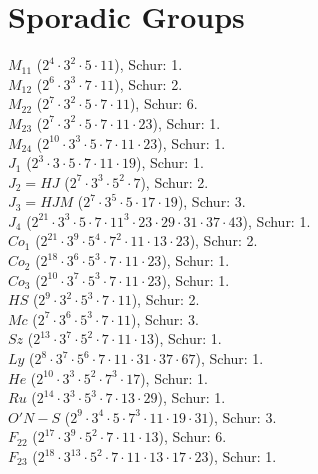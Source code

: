 \section {Sporadic Groups}
$M_{11}$ ($2^4 \cdot 3^2 \cdot 5 \cdot 11$), Schur: 1.
\\
$M_{12}$ ($2^6 \cdot 3^3 \cdot 7 \cdot 11$), Schur: 2.
\\
$M_{22}$ ($2^{7} \cdot 3^2 \cdot 5 \cdot 7 \cdot 11$), Schur: 6.
\\
$M_{23}$ ($2^{7} \cdot 3^2 \cdot 5 \cdot 7 \cdot 11 \cdot 23$), Schur: 1.
\\
$M_{24}$ ($2^{10} \cdot 3^3 \cdot 5 \cdot 7 \cdot 11 \cdot 23$), Schur: 1.
\\
$J_1$ ($2^{3} \cdot 3 \cdot 5 \cdot 7 \cdot 11 \cdot 19$), Schur: 1.
\\
$J_2 = HJ$ ($2^{7} \cdot 3^3 \cdot 5^2 \cdot 7$), Schur: 2.
\\
$J_3 = HJM$ ($2^{7} \cdot 3^5 \cdot 5 \cdot 17 \cdot 19$), Schur: 3.
\\
$J_4$ ($2^{21} \cdot 3^3 \cdot 5 \cdot 7 \cdot 11^3 \cdot 23 \cdot 29 \cdot 31 \cdot 37 \cdot 43$), Schur: 1.
\\
$Co_1$ ($2^{21} \cdot 3^9 \cdot 5^4 \cdot 7^2 \cdot 11 \cdot 13 \cdot 23$), Schur: 2.
\\
$Co_2$ ($2^{18} \cdot 3^6 \cdot 5^3 \cdot 7 \cdot 11 \cdot 23$), Schur: 1.
\\
$Co_3$ ($2^{10} \cdot 3^7 \cdot 5^3 \cdot 7 \cdot 11 \cdot 23$), Schur: 1.
\\
$HS$ ($2^{9} \cdot 3^2 \cdot 5^3 \cdot 7 \cdot 11$), Schur: 2.
\\
$Mc$ ($2^{7} \cdot 3^6 \cdot 5^3 \cdot 7 \cdot 11$), Schur: 3.
\\
$Sz$ ($2^{13} \cdot 3^7 \cdot 5^2 \cdot 7 \cdot 11 \cdot 13$), Schur: 1.
\\
$Ly$ ($2^{8} \cdot 3^7 \cdot 5^6 \cdot 7 \cdot 11 \cdot 31 \cdot 37 \cdot 67$), Schur: 1.
\\
$He$ ($2^{10} \cdot 3^3 \cdot 5^2 \cdot 7^3 \cdot 17$), Schur: 1.
\\
$Ru$ ($2^{14} \cdot 3^3 \cdot 5^3 \cdot 7 \cdot 13 \cdot 29$), Schur: 1.
\\
$O'N-S$ ($2^9 \cdot 3^4 \cdot 5 \cdot 7^3 \cdot 11 \cdot 19 \cdot 31$), Schur: 3.
\\
$F_{22}$ ($2^{17} \cdot 3^9 \cdot 5^2 \cdot 7 \cdot 11 \cdot 13$), Schur: 6.
\\
$F_{23}$ ($2^{18} \cdot 3^{13} \cdot 5^2 \cdot 7 \cdot 11 \cdot 13 \cdot 17 \cdot 23$), Schur: 1.
